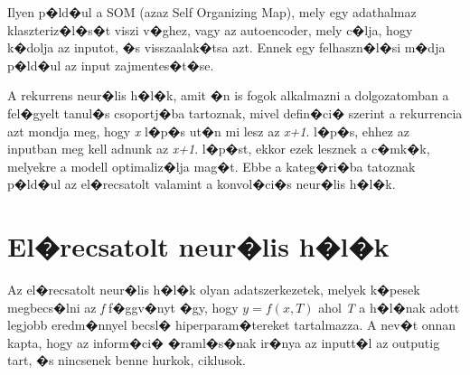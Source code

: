 \documentclass[12pt]{report}
\theoremstyle{definition}
\begin{document}
Ilyen p�ld�ul a SOM (azaz Self Organizing Map), mely egy adathalmaz klaszteriz�l�s�t viszi v�ghez, vagy az autoencoder, mely c�lja, hogy k�dolja az inputot, �s visszaalak�tsa azt. Ennek egy felhaszn�l�si m�dja p�ld�ul az input zajmentes�t�se. 

A rekurrens neur�lis h�l�k, amit �n is fogok alkalmazni a dolgozatomban a fel�gyelt tanul�s csoportj�ba tartoznak, mivel defin�ci� szerint a rekurrencia azt mondja meg, hogy \textit{x} l�p�s ut�n mi lesz az \textit{x+1}. l�p�s, ehhez az inputban meg kell adnunk az \textit{x+1}. l�p�st, ekkor ezek lesznek a c�mk�k, melyekre a modell optimaliz�lja mag�t. Ebbe a kateg�ri�ba tatoznak p�ld�ul az el�recsatolt valamint a konvol�ci�s neur�lis h�l�k.

\section{El�recsatolt neur�lis h�l�k}

Az el�recsatolt neur�lis h�l�k olyan adatszerkezetek, melyek k�pesek megbecs�lni az \textit{f} f�ggv�nyt �gy, hogy $ y = f(x, T) $ ahol \textit{T} a h�l�nak adott legjobb eredm�nnyel becsl� hiperparam�tereket tartalmazza. A nev�t onnan kapta, hogy az inform�ci� �raml�s�nak ir�nya az inputt�l az outputig tart, �s nincsenek benne hurkok, ciklusok.
\end{document}
